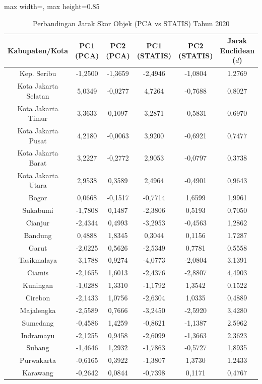 \begin{table}[H]
\centering
\caption{Perbandingan Jarak Skor Objek (PCA vs STATIS) Tahun 2020} \label{tab:app1jarak_skor_2020}
\begin{adjustbox}{max width=\textwidth, max height=0.85\textheight}
\begin{tabular}{|c|c|c|c|c|c|}
\hline
\textbf{Kabupaten/Kota} & \textbf{PC1 (PCA)} & \textbf{PC2 (PCA)} & \textbf{PC1 (STATIS)} & \textbf{PC2 (STATIS)} & \textbf{Jarak Euclidean ($d$)} \\
\hline
Kep. Seribu & -1,2500 & -1,3659 & -2,4946 & -1,0804 & 1,2769 \\
Kota Jakarta Selatan & 5,0349 & -0,0277 & 4,7264 & -0,7688 & 0,8027 \\
Kota Jakarta Timur & 3,3633 & 0,1097 & 3,2871 & -0,5831 & 0,6970 \\
Kota Jakarta Pusat & 4,2180 & -0,0063 & 3,9200 & -0,6921 & 0,7477 \\
Kota Jakarta Barat & 3,2227 & -0,2772 & 2,9053 & -0,0797 & 0,3738 \\
Kota Jakarta Utara & 2,9538 & 0,3589 & 2,4964 & -0,4901 & 0,9643 \\
Bogor & 0,0668 & -0,1517 & -0,7714 & 1,6599 & 1,9961 \\
Sukabumi & -1,7808 & 0,1487 & -2,3806 & 0,5193 & 0,7050 \\
Cianjur & -2,4344 & 0,4993 & -3,2953 & -0,4563 & 1,2862 \\
Bandung & 0,4888 & 1,8345 & 0,3044 & 0,1156 & 1,7287 \\
Garut & -2,0225 & 0,5626 & -2,5349 & 0,7781 & 0,5558 \\
Tasikmalaya & -3,1788 & 0,9274 & -4,0773 & -2,0804 & 3,1391 \\
Ciamis & -2,1655 & 1,6013 & -2,4376 & -2,8807 & 4,4903 \\
Kuningan & -1,0288 & 1,3310 & -1,1792 & 1,3542 & 0,1522 \\
Cirebon & -2,1433 & 1,0756 & -2,6304 & 1,0335 & 0,4889 \\
Majalengka & -2,5589 & 0,7666 & -3,2450 & -2,5920 & 3,4280 \\
Sumedang & -0,4586 & 1,4259 & -0,8621 & -1,1387 & 2,5962 \\
Indramayu & -2,1255 & 0,9458 & -2,6099 & -1,3663 & 2,3623 \\
Subang & -1,4646 & 1,2932 & -1,7863 & -0,5727 & 1,8935 \\
Purwakarta & -0,6165 & 0,3922 & -1,3807 & 1,3730 & 1,2433 \\
Karawang & -0,2642 & 0,0844 & -0,7398 & 0,1171 & 0,4767 \\

\end{tabular}
\end{adjustbox}
\end{table}
